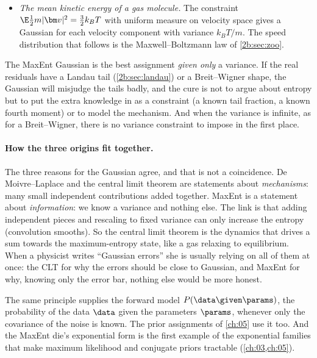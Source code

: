\begin{itemize}
  \[
    p(N)\propto\frac{M^N}{N!}e^{-\lambda N}=\frac{(Me^{-\lambda})^N}{N!}
    \quad\Longrightarrow\quad
    p(N)=e^{-\mu}\frac{\mu^N}{N!},
  \]
  where normalisation, $\sum_N(Me^{-\lambda})^N/N!=e^{Me^{-\lambda}}$, and the mean condition identify $Me^{-\lambda}=\mu$. The unknown $M$ drops out, and we recover the Poisson distribution of \cref{2a:sec:poisson-limit} from knowledge of the mean alone.
  \item \emph{The mean kinetic energy of a gas molecule.} The constraint $\E\frac12m|\bm v|^2=\frac32k_BT$ with uniform measure on velocity space gives a Gaussian for each velocity component with variance $k_BT/m$. The speed distribution that follows is the Maxwell--Boltzmann law of \cref{2b:sec:zoo}.
\end{itemize}

\begin{pitfall}
The MaxEnt Gaussian is the best assignment \emph{given only} a variance. If the real residuals have a Landau tail (\cref{2b:sec:landau}) or a Breit--Wigner shape, the Gaussian will misjudge the tails badly, and the cure is not to argue about entropy but to put the extra knowledge in as a constraint (a known tail fraction, a known fourth moment) or to model the mechanism. And when the variance is infinite, as for a Breit--Wigner, there is no variance constraint to impose in the first place.
\end{pitfall}

\paragraph{How the three origins fit together.} The three reasons for the Gaussian agree, and that is not a coincidence. De Moivre--Laplace and the central limit theorem are statements about \emph{mechanisms}: many small independent contributions added together. MaxEnt is a statement about \emph{information}: we know a variance and nothing else. The link is that adding independent pieces and rescaling to fixed variance can only increase the entropy (convolution smooths). So the central limit theorem is the dynamics that drives a sum towards the maximum-entropy state, like a gas relaxing to equilibrium. When a physicist writes ``Gaussian errors'' she is usually relying on all of them at once: the CLT for why the errors should be close to Gaussian, and MaxEnt for why, knowing only the error bar, nothing else would be more honest.

The same principle supplies the forward model $P(\data\given\params)$, the probability of the data $\data$ given the parameters $\params$, whenever only the covariance of the noise is known. The prior assignments of \cref{ch:05} use it too. And the MaxEnt die's exponential form is the first example of the exponential families that make maximum likelihood and conjugate priors tractable (\cref{ch:03,ch:05}).

